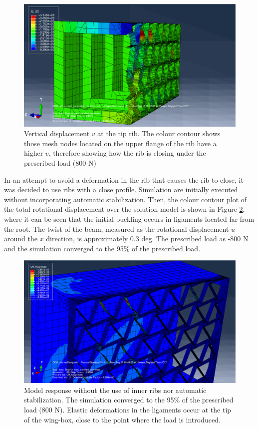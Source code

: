     \begin{figure}[!htpb]
      \centering
      \includegraphics[width=0.8 \textwidth]{figures/result-model/closeOfRib-800N}
      \caption[Vertical displacement $v$ at the tip rib]{Vertical displacement $v$ at the tip rib. The colour contour shows those mesh nodes located on the upper flange of the rib have a higher $v$, therefore showing how the rib is closing under the prescribed load (800 N)}\label{fig:closeOfRib-800N}
    \end{figure}

    In an attempt to avoid a deformation in the rib that causes the rib to close, it was decided to use ribs with a close profile. Simulation are initially executed without incorporating automatic stabilization. Then, the colour contour plot of the total rotational displacement over the solution model is shown in Figure \ref{fig:normalCaseNoDampNoInnerRibs_800N}, where it can be seen that the initial buckling occurs in ligaments located far from the root. The twist of the beam, measured as the rotational displacement $u$ around the $x$ direction, is approximately 0.3 deg. The prescribed load as -800 N and the simulation converged to the 95\% of the prescribed load.

    \begin{figure}[!htpb]
      \centering
      \includegraphics[width=0.8 \textwidth]{figures/result-model/normalCaseNoDampNoInnerRibs_800N}
      \caption[Model response without the use of inner ribs nor automatic stabilization]{Model response without the use of inner ribs nor automatic stabilization. The simulation converged to the 95\% of the prescribed load (800 N). Elastic deformations in the ligaments occur at the tip of the wing-box, close to the point where the load is introduced.}\label{fig:normalCaseNoDampNoInnerRibs_800N}
    \end{figure}

